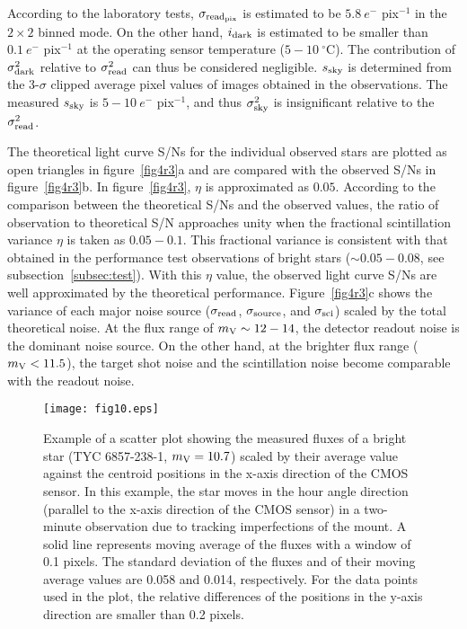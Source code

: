 \documentclass{pasj01}
\newcommand{\void}[1]{}
\renewcommand{\textcolor}{\void}
\begin{document}
According to the laboratory tests, 
$\sigma_{\rm read_{\rm pix}}$ is estimated to be $5.8  \  e^{-}$ pix$^{-1}$
in the $2 \times 2$ binned mode.
On the other hand, $i_{\rm dark}$ is estimated to be smaller than $0.1  \  e^{-}$ pix$^{-1}$ 
at the operating sensor temperature ($5-10 \ {}^\circ\mathrm{C}$).
The contribution of $\sigma_{\rm dark}^2$ relative to $\sigma_{\rm read}^2$ can thus be considered negligible. 
\textcolor{red}{
$s_{\rm sky}$ is determined from the 3-$\sigma$ clipped average pixel values 
of images obtained in the observations. 
The measured $s_{\rm sky}$ is $5-10 \  e^{-}$ pix$^{-1}$,
}
and thus $\sigma_{\rm sky}^2$ is insignificant relative to the $\sigma_{\rm read}^2$.

The theoretical light curve S/Ns for the individual observed stars are 
plotted as open triangles in figure~\ref{fig4r3}a 
and are compared with the observed S/Ns in figure~\ref{fig4r3}b. 
In figure~\ref{fig4r3}, $\eta$ is approximated as $0.05$.
According to the comparison between the theoretical S/Ns and the observed values, 
the ratio of observation to theoretical S/N approaches unity
when the fractional scintillation variance $\eta$ is taken as $0.05-0.1$.
This fractional variance is consistent with that obtained in the performance test 
observations of bright stars ($\sim 0.05-0.08$, see subsection~\ref{subsec:test}).
With this $\eta$ value,
the observed light curve S/Ns are well approximated by the theoretical performance.
Figure~\ref{fig4r3}c shows the variance of each major noise source ($\sigma_{\rm read}$, $\sigma_{\rm source}$, and $\sigma_{\rm sci}$) 
scaled by the total theoretical noise. 
At the flux range of $m_{\rm V} \sim 12-14$, 
the detector readout noise is the dominant noise source.
On the other hand, at the brighter flux range ($m_{\rm V} < 11.5$),
the  target shot noise and the scintillation noise become 
comparable with the  readout noise.

\begin{figure}[!pt]
\begin{center}
   \texttt{[image: fig10.eps]}
   \caption{
   \textcolor{red}{
   Example of a scatter plot showing the measured fluxes of a bright star (TYC 6857-238-1, $m_{\rm V} = 10.7$) 
   scaled by their average value against the centroid positions in the x-axis direction of the CMOS sensor.
   In this example, the star moves in the hour angle direction 
   (parallel to the x-axis direction of the CMOS sensor) in a two-minute observation
   due to tracking imperfections of the mount.
   A solid line represents moving average of the fluxes with a window of 0.1 pixels. 
   The standard deviation of the fluxes and of their moving average values
   are 0.058 and 0.014, respectively.
   For the data points used in the plot, 
   the relative differences of the positions in the y-axis direction  are smaller than 0.2 pixels.
   }
   }
   \label{fig_cent}
 \end{center}
\end{figure}
\end{document}
